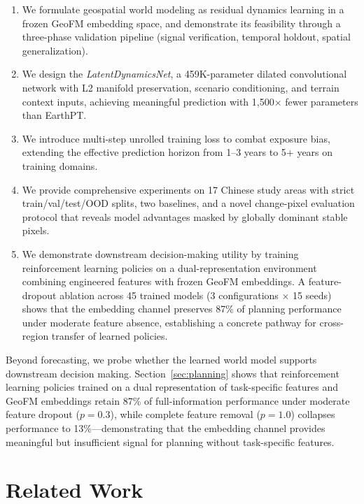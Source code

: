 \documentclass{article}
\begin{document}
\begin{enumerate}
\item We formulate geospatial world modeling as residual dynamics learning in a frozen GeoFM embedding space, and demonstrate its feasibility through a three-phase validation pipeline (signal verification, temporal holdout, spatial generalization).

\item We design the \textit{LatentDynamicsNet}, a 459K-parameter dilated convolutional network with L2 manifold preservation, scenario conditioning, and terrain context inputs, achieving meaningful prediction with 1{,}500$\times$ fewer parameters than EarthPT.

\item We introduce multi-step unrolled training loss to combat exposure bias, extending the effective prediction horizon from 1--3 years to 5+ years on training domains.

\item We provide comprehensive experiments on 17 Chinese study areas with strict train/val/test/OOD splits, two baselines, and a novel change-pixel evaluation protocol that reveals model advantages masked by globally dominant stable pixels.

\item We demonstrate downstream decision-making utility by training reinforcement learning policies on a dual-representation environment combining engineered features with frozen GeoFM embeddings. A feature-dropout ablation across 45 trained models (3 configurations $\times$ 15 seeds) shows that the embedding channel preserves 87\% of planning performance under moderate feature absence, establishing a concrete pathway for cross-region transfer of learned policies.
\end{enumerate}

Beyond forecasting, we probe whether the learned world model supports downstream decision making. Section~\ref{sec:planning} shows that reinforcement learning policies trained on a dual representation of task-specific features and GeoFM embeddings retain 87\% of full-information performance under moderate feature dropout ($p=0.3$), while complete feature removal ($p=1.0$) collapses performance to 13\%---demonstrating that the embedding channel provides meaningful but insufficient signal for planning without task-specific features.


\section{Related Work}
\label{sec:related}
\end{document}
